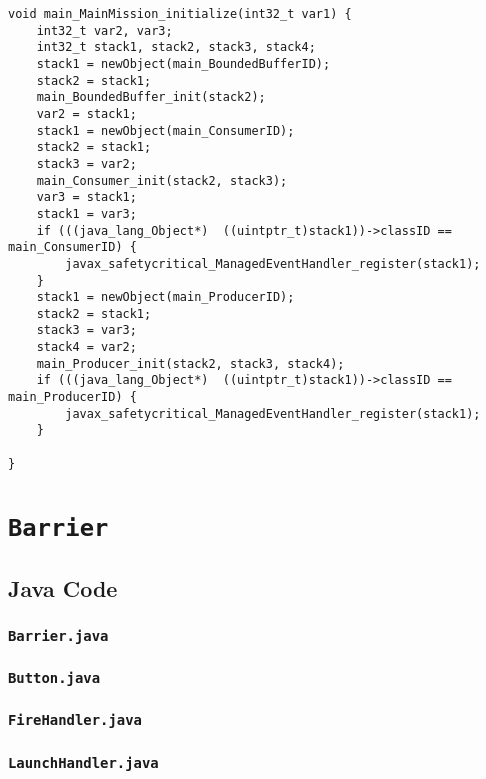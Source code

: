 \begin{landscape}
\begin{multicols}{2}
\begin{lstlisting}[firstnumber=2505]
void main_MainMission_initialize(int32_t var1) {
	int32_t var2, var3;
	int32_t stack1, stack2, stack3, stack4;
	stack1 = newObject(main_BoundedBufferID);
	stack2 = stack1;
	main_BoundedBuffer_init(stack2);
	var2 = stack1;
	stack1 = newObject(main_ConsumerID);
	stack2 = stack1;
	stack3 = var2;
	main_Consumer_init(stack2, stack3);
	var3 = stack1;
	stack1 = var3;
	if (((java_lang_Object*)  ((uintptr_t)stack1))->classID == main_ConsumerID) {
		javax_safetycritical_ManagedEventHandler_register(stack1);
	}
	stack1 = newObject(main_ProducerID);
	stack2 = stack1;
	stack3 = var3;
	stack4 = var2;
	main_Producer_init(stack2, stack3, stack4);
	if (((java_lang_Object*)  ((uintptr_t)stack1))->classID == main_ProducerID) {
		javax_safetycritical_ManagedEventHandler_register(stack1);
	}

}
\end{lstlisting}

\section{\texorpdfstring{\texttt{Barrier}}{Barrier}}
\label{Barrier-code-section}

\subsection{Java Code}
\label{Barrier-java-code-subsection}

\subsubsection{\texttt{Barrier.java}}


\subsubsection{\texttt{Button.java}}


\subsubsection{\texttt{FireHandler.java}}


\subsubsection{\texttt{LaunchHandler.java}}



\end{multicols}
\end{landscape}
